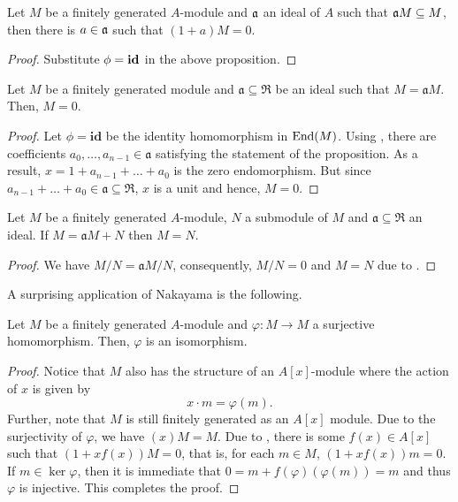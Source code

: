 \begin{corollary}
    Let $M$ be a finitely generated $A$-module and $\mathfrak a$ an ideal of $A$ such that $\mathfrak a M\subseteq M$, then there is $a\in\mathfrak a$ such that $(1 + a)M = 0$.
\end{corollary}
\begin{proof}
    Substitute $\phi = \mathbf{id}$ in the above proposition.
\end{proof}

\begin{lemma}[Nakayama]
    Let $M$ be a finitely generated module and $\mathfrak a\subseteq\mathfrak R$ be an ideal such that $M = \mathfrak aM$. Then, $M = 0$. 
\end{lemma}
\begin{proof}
    Let $\phi = \mathbf{id}$ be the identity homomorphism in $\operatorname{End}(M)$. Using , there are coefficients $a_0,\ldots,a_{n - 1}\in\mathfrak a$ satisfying the statement of the proposition. As a result, $x = 1 + a_{n - 1} + \ldots + a_0$ is the zero endomorphism. But since $a_{n - 1} + \ldots + a_0\in\mathfrak a\subseteq\mathfrak R$, $x$ is a unit and hence, $M = 0$.
\end{proof}

\begin{corollary}
    Let $M$ be a finitely generated $A$-module, $N$ a submodule of $M$ and $\mathfrak a\subseteq\mathfrak R$ an ideal. If $M = \mathfrak aM + N$ then $M = N$.
\end{corollary}
\begin{proof}
    We have $M/N = \mathfrak aM/N$, consequently, $M/N = 0$ and $M = N$ due to .
\end{proof}

A surprising application of Nakayama is the following. 
\begin{proposition}
    Let $M$ be a finitely generated $A$-module and $\varphi: M\to M$ a surjective homomorphism. Then, $\varphi$ is an isomorphism.
\end{proposition}
\begin{proof}
    Notice that $M$ also has the structure of an $A[x]$-module where the action of $x$ is given by 
    \begin{equation*}
        x\cdot m = \varphi(m).
    \end{equation*}
    Further, note that $M$ is still finitely generated as an $A[x]$ module. Due to the surjectivity of $\varphi$, we have $(x)M = M$. Due to , there is some $f(x)\in A[x]$ such that $(1 + xf(x))M = 0$, that is, for each $m\in M$, $(1 + xf(x))m = 0$. If $m\in\ker\varphi$, then it is immediate that $0 = m + f(\varphi)(\varphi(m)) = m$ and thus $\varphi$ is injective. This completes the proof.
\end{proof}

